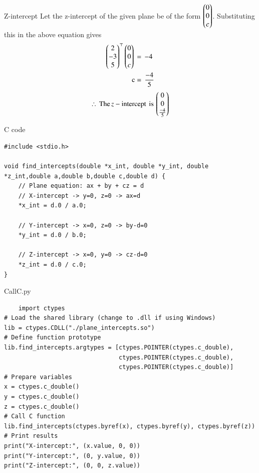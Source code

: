 \documentclass{beamer}
\begin{document}
\begin{frame}{Z-intercept}
 Let the z-intercept of the given plane be of the form $\begin{pmatrix}0\\0\\c\end{pmatrix}$. Substituting this in the above equation gives
\begin{align}
   \begin{pmatrix}2\\-3\\5\end{pmatrix}^\top \begin{pmatrix}0\\0\\c\end{pmatrix}\,&=\,-4\\
    \text{c}&=\,\frac{-4}{5}
\end{align}
\begin{align*}
    \therefore \,\text{The}\, z-\text{intercept \,is\,} \begin{pmatrix}0\\0\\\frac{-4}{5}\end{pmatrix}
\end{align*}
\end{frame}

\begin{frame}[fragile]{C code}
\begin{lstlisting}
#include <stdio.h>

void find_intercepts(double *x_int, double *y_int, double *z_int,double a,double b,double c,double d) {
    // Plane equation: ax + by + cz = d
    // X-intercept -> y=0, z=0 -> ax=d 
    *x_int = d.0 / a.0;

    // Y-intercept -> x=0, z=0 -> by-d=0 
    *y_int = d.0 / b.0;

    // Z-intercept -> x=0, y=0 -> cz-d=0 
    *z_int = d.0 / c.0;
}
\end{lstlisting}
\end{frame}

\begin{frame}[fragile]{CallC.py}
\begin{lstlisting}
    import ctypes
# Load the shared library (change to .dll if using Windows)
lib = ctypes.CDLL("./plane_intercepts.so")
# Define function prototype
lib.find_intercepts.argtypes = [ctypes.POINTER(ctypes.c_double),
                                ctypes.POINTER(ctypes.c_double),
                                ctypes.POINTER(ctypes.c_double)]
# Prepare variables
x = ctypes.c_double()
y = ctypes.c_double()
z = ctypes.c_double()
# Call C function
lib.find_intercepts(ctypes.byref(x), ctypes.byref(y), ctypes.byref(z))
# Print results
print("X-intercept:", (x.value, 0, 0))
print("Y-intercept:", (0, y.value, 0))
print("Z-intercept:", (0, 0, z.value))
\end{lstlisting}
\end{frame}
\end{document}
